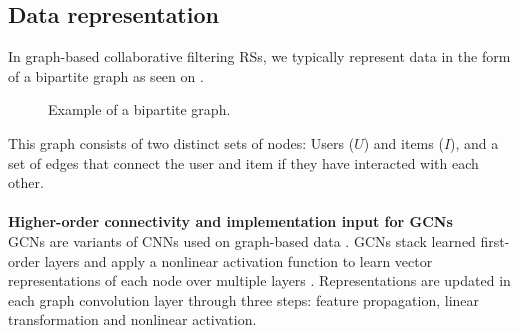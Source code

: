 \subsection{Data representation}
In graph-based collaborative filtering RSs, we typically represent data in the form of a bipartite graph as seen on .
\begin{figure}[h]
\caption{Example of a bipartite graph.}
\label{fig:bipartite-graph}
\end{figure}
This graph consists of two distinct sets of nodes: Users ($U$) and items ($I$), and a set of edges that connect the user and item if they have interacted with each other.\\\\
\textbf{Higher-order connectivity and implementation input for GCNs}
\\
GCNs are variants of CNNs used on graph-based data \cite{KOrderConnectivity}.
GCNs stack learned first-order layers and apply a nonlinear activation function to learn vector representations of each node over multiple layers \cite{KOrderConnectivity}.
Representations are updated in each graph convolution layer through three steps: feature propagation, linear transformation and nonlinear activation.
